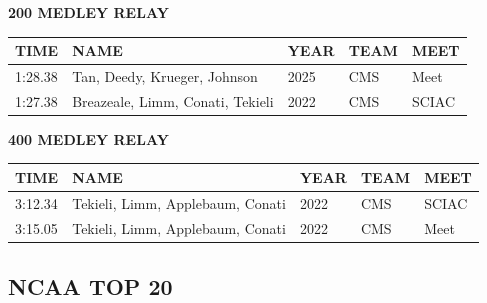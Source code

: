 \begin{table}[H]
\centering
\begin{minipage}[t]{0.6\textwidth}
\centering
\textbf{200 MEDLEY RELAY}\\[0.1cm]
\begin{tabular}{@{}p{1.8cm}p{2.8cm}p{1.2cm}p{1.4cm}p{1.4cm}@{}}
\hline
    \textbf{TIME} & \textbf{NAME} & \textbf{YEAR} & \textbf{TEAM} & \textbf{MEET} \\
\hline
    1:28.38 & Tan, Deedy, Krueger, Johnson & 2025 & CMS & Meet \\
    1:27.38 & Breazeale, Limm, Conati, Tekieli & 2022 & CMS & SCIAC \\
\hline
\end{tabular}
\end{minipage}
\end{table}

\begin{table}[H]
\centering
\begin{minipage}[t]{0.6\textwidth}
\centering
\textbf{400 MEDLEY RELAY}\\[0.1cm]
\begin{tabular}{@{}p{1.8cm}p{2.8cm}p{1.2cm}p{1.4cm}p{1.4cm}@{}}
\hline
    \textbf{TIME} & \textbf{NAME} & \textbf{YEAR} & \textbf{TEAM} & \textbf{MEET} \\
\hline
    3:12.34 & Tekieli, Limm, Applebaum, Conati & 2022 & CMS & SCIAC \\
    3:15.05 & Tekieli, Limm, Applebaum, Conati & 2022 & CMS & Meet \\
\hline
\end{tabular}
\end{minipage}
\end{table}


\newpage



\subsection{NCAA TOP 20}

